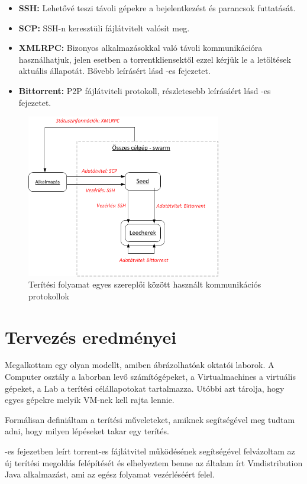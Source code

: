 \begin{itemize}
  \item \textbf{SSH}\cite{ylonen2006secure}\textbf{:} Lehetővé teszi távoli gépekre a bejelentkezést és parancsok futtatását.
  \item \textbf{SCP}\cite{pechanec2007scp}\textbf{:} SSH-n keresztüli fájlátvitelt  valósít meg.
  \item \textbf{XMLRPC:} Bizonyos alkalmazásokkal való távoli kommunikációra használhatjuk, jelen esetben a torrentkliensektől ezzel kérjük le a letöltések aktuális állapotát. Bővebb leírásért lásd -es fejezetet.
  \item \textbf{Bittorrent:} P2P fájlátviteli protokoll, részletesebb leírásáért lásd -es fejezetet.
\end{itemize}

\begin{figure}[ht]
	\centering
	\includegraphics[width=85mm, keepaspectratio]{figures/design_protocols.png}
	\caption{Terítési folyamat egyes szereplői között használt kommunikációs protokollok}
	\label{fig:designprotocols}
\end{figure}

\section{Tervezés eredményei}
Megalkottam egy olyan modellt, amiben ábrázolhatóak oktatói laborok. A Computer osztály a laborban levő számítógépeket, a Virtualmachines a virtuális gépeket, a Lab a terítési célállapotokat tartalmazza. Utóbbi azt tárolja, hogy egyes gépekre melyik VM-nek kell rajta lennie.

Formálisan definiáltam a terítési műveleteket, amiknek segítségével meg tudtam adni, hogy milyen lépéseket takar egy terítés.

-es fejezetben leírt torrent-es fájlátvitel működésének segítségével felvázoltam az új terítési megoldás felépítését és elhelyeztem benne az általam írt Vmdistribution Java alkalmazást, ami az egész folyamat vezérléséért felel.